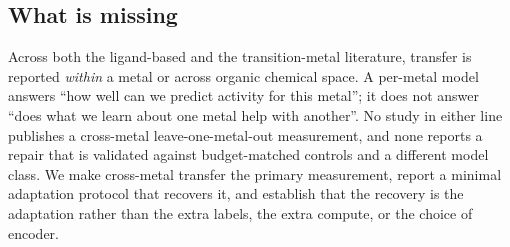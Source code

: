 \subsection{What is missing}
\label{sec:related:gap}

Across both the ligand-based and the transition-metal literature, transfer is
reported \emph{within} a metal or across organic chemical space. A per-metal
model answers ``how well can we predict activity for this metal''; it does not
answer ``does what we learn about one metal help with another''. No study in
either line publishes a cross-metal leave-one-metal-out measurement, and none
reports a repair that is validated against budget-matched controls and a
different model class. We make cross-metal transfer the primary measurement,
report a minimal adaptation protocol that recovers it, and establish that the
recovery is the adaptation rather than the extra labels, the extra compute, or
the choice of encoder.
